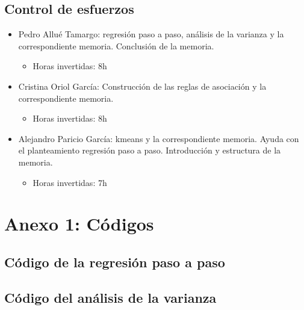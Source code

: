 \documentclass{article}
\begin{document}
\subsection{Control de esfuerzos}
\begin{itemize}
    \item Pedro Allué Tamargo: regresión paso a paso, análisis de la varianza y la correspondiente memoria. Conclusión de la memoria. 
        \begin{itemize}
            \item Horas invertidas: 8h
        \end{itemize}
    \item Cristina Oriol García: Construcción de las reglas de asociación y la correspondiente memoria. 
        \begin{itemize}
            \item Horas invertidas: 8h
        \end{itemize}
    \item Alejandro Paricio García: kmeans y la correspondiente memoria. Ayuda con el planteamiento regresión paso a paso. Introducción y estructura de la memoria.
        \begin{itemize}
            \item Horas invertidas: 7h
        \end{itemize}
\end{itemize}


\newpage
\section*{Anexo 1: Códigos}

\subsection*{Código de la regresión paso a paso}




\subsection*{Código del análisis de la varianza}




\newpage
{}


\end{document}
